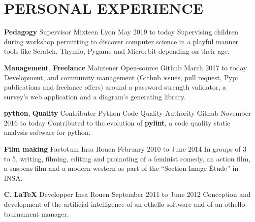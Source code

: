 \documentclass[11pt,a4paper]{moderncv}
\begin{document}
  \section{PERSONAL EXPERIENCE}

    \cventry
    {\textbf{Pedagogy}}
    {Supervisor}
    {Mixteen}
    {Lyon}
    {May 2019 to today}{
	  Supervising children during workshop permitting to discover computer science in a
	  playful manner tools like Scratch, Thymio, Pygame and Micro$:$bit depending on their age.
    }

    \cventry
    {\textbf{Management}, \textbf{Freelance}}
    {Maintener}
    {Open-source}
    {Github}
    {March 2017  to today}{
      Development, and community management (Github issues, pull request, Pypi publications and freelance offers)
	  around a password strength validator, a survey's web application and a diagram's generating library.
    }

    \cventry
    {\textbf{python}, \textbf{Quality}}
    {Contributer}
    {Python Code Quality Authority}
    {Github}
    {November 2016  to today}{
      Contributed to the evolution of \textbf{pylint}, a code quality static analysis software for python.
    }



    \cventry
    {\textbf{Film making}}
    {Factotum}
    {Insa}
    {Rouen}
    {February 2010 to June 2014}{
      In groups of 3 to 5, writing, filming, editing and promoting of a
      feminist comedy, an action film, a suspens film and a modern western as
      part of the ``Section Image Étude'' in INSA.
    }




    \cventry
    {\textbf{C}, \textbf{\LaTeX{}}}
	{Developper}
    {Insa}
    {Rouen}
    {September 2011 to June 2012}{
      Conception and development of the artificial intelligence of an othello
      software and of an othello tournament manager.
    }
\end{document}
